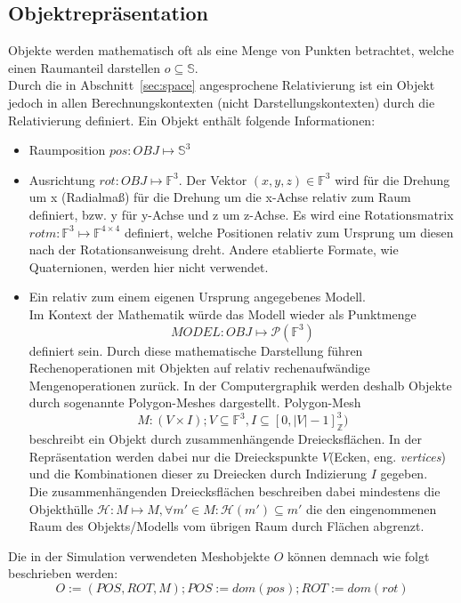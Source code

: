 \subsection{Objektrepräsentation}
\label{sec:objects_rep}
Objekte werden mathematisch oft als eine Menge von Punkten betrachtet, welche einen Raumanteil darstellen $ o \subseteq \mathbb{S}$.\\
Durch die in Abschnitt~\ref{sec:space} angesprochene Relativierung ist ein Objekt jedoch in allen Berechnungskontexten (nicht Darstellungskontexten) durch die Relativierung definiert. Ein Objekt enthält folgende Informationen:
\begin{itemize}
\item Raumposition $pos : OBJ \mapsto \mathbb{S}^3$
\item Ausrichtung $rot : OBJ \mapsto \mathbb{F}^3$. Der Vektor $(x, y, z) \in\mathbb{F}^3$ wird für die Drehung um x (Radialmaß) für die Drehung um die x-Achse relativ zum Raum definiert, bzw. y für y-Achse und z um z-Achse. Es wird eine Rotationsmatrix $rotm: \mathbb{F}^3 \mapsto \mathbb{F}^{4\times 4}$ definiert, welche Positionen relativ zum Ursprung um diesen nach der Rotationsanweisung dreht. Andere etablierte Formate, wie Quaternionen, werden hier nicht verwendet.
\item Ein relativ zum einem eigenen Ursprung angegebenes Modell.\\
\sloppy
Im Kontext der Mathematik würde das Modell wieder als Punktmenge $$ MODEL : OBJ \mapsto \mathcal{P}(\mathbb{F}^3) $$ definiert sein.
\fussy
Durch diese mathematische Darstellung führen Rechenoperationen mit Objekten auf relativ rechenaufwändige Mengenoperationen zurück. In der Computergraphik werden deshalb Objekte durch sogenannte Polygon-Meshes dargestellt. 
Polygon-Mesh $$M: (V \times I); V \subseteq \mathbb{F}^3, I \subseteq [0, |V|-1]_\mathbb{Z}^3 )$$ beschreibt ein Objekt durch zusammenhängende Dreiecksflächen. In der Repräsentation werden dabei nur die Dreieckspunkte $V$(Ecken, eng. \textit{vertices}) und die Kombinationen dieser zu Dreiecken durch Indizierung $I$ gegeben.\\
Die zusammenhängenden Dreiecksflächen beschreiben dabei mindestens die Objekthülle $\mathcal{H}: M \mapsto M, \forall m'\in M: \mathcal{H}(m') \subseteq m'$ die den eingenommenen Raum des Objekts/Modells vom übrigen Raum durch Flächen abgrenzt.
\end{itemize}  
Die in der Simulation verwendeten Meshobjekte $O$ können demnach wie folgt beschrieben werden:
$$ O:=(POS, ROT, M); POS:= dom(pos); ROT:=dom(rot) $$
